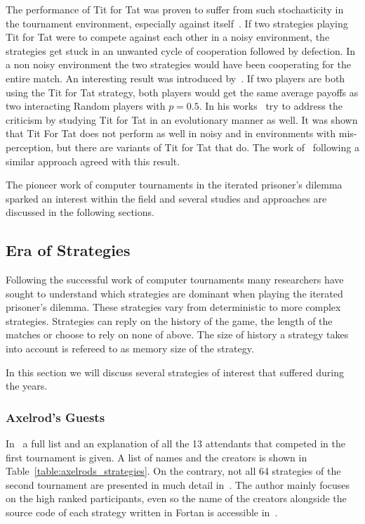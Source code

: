 \documentclass{article}
\begin{document}
The performance of Tit for Tat was proven to suffer from such stochasticity in
the tournament environment, especially against itself~\cite{Bendor1991,Godfray1992,
Molander1985, Nowak1992, Wolfgang2006}. If two strategies playing Tit for Tat were
to compete against each other in a noisy environment, the strategies get stuck 
in an unwanted cycle of cooperation followed by defection. In a non noisy environment
the two strategies would have been cooperating for the entire match.
An interesting result was introduced by~\cite{Molander1985}.
If two players are both using the Tit for Tat strategy, both players would get
the same average payoffs as two interacting Random players with \(p=0.5\).
In his works~\cite{axelrod1988} try to address the criticism by studying Tit for 
Tat in an evolutionary manner as well. It was shown that Tit For Tat does not 
perform as well in noisy and in environments with mis-perception, but there are 
variants of Tit for Tat that do. The work of~\cite{Nowak1990} following a similar
approach agreed with this result.

The pioneer work of computer tournaments in the iterated prisoner's dilemma
sparked an interest within the field and several studies and approaches are
discussed in the following sections.

\subsection{Era of Strategies}

Following the successful work of computer tournaments many researchers have sought
to understand which strategies are dominant when playing the iterated prisoner's
dilemma. These strategies vary from deterministic to more complex strategies.
Strategies can reply on the history of the game, the length of the matches or 
choose to rely on none of above. The size of history a strategy takes into account
is refereed to as memory size of the strategy. 

In this section we will discuss several strategies of interest that suffered
during the years.

\subsubsection{Axelrod's Guests}\label{subsection:axelrods_guests}

In~\cite{Axelrod1981} a full list and an explanation of all the 13 attendants
that competed in the first tournament is given. A list of names and the creators
is shown in Table~\ref{table:axelrods_strategies}. On the contrary, not all 64 
strategies of the second tournament are presented in much detail in~\cite{Axelrod1981}.
The author mainly focuses on the high ranked participants, even so the name
of the creators alongside the source code of each 
strategy written in Fortan is accessible in~\cite{fortan_code}.
\end{document}
